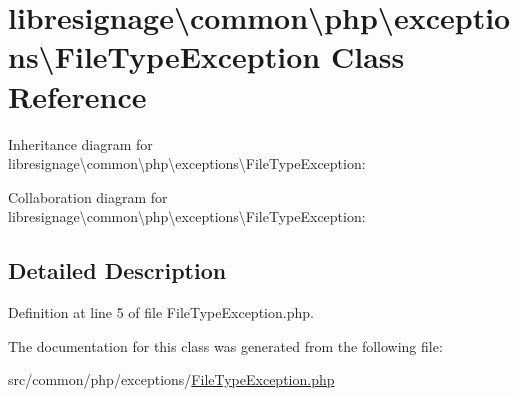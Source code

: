 \hypertarget{classlibresignage_1_1common_1_1php_1_1exceptions_1_1FileTypeException}{}\section{libresignage\textbackslash{}common\textbackslash{}php\textbackslash{}exceptions\textbackslash{}File\+Type\+Exception Class Reference}
\label{classlibresignage_1_1common_1_1php_1_1exceptions_1_1FileTypeException}


Inheritance diagram for libresignage\textbackslash{}common\textbackslash{}php\textbackslash{}exceptions\textbackslash{}File\+Type\+Exception\+:


Collaboration diagram for libresignage\textbackslash{}common\textbackslash{}php\textbackslash{}exceptions\textbackslash{}File\+Type\+Exception\+:


\subsection{Detailed Description}


Definition at line 5 of file File\+Type\+Exception.\+php.



The documentation for this class was generated from the following file\+:\begin{DoxyCompactItemize}
\item 
src/common/php/exceptions/\hyperlink{FileTypeException_8php}{File\+Type\+Exception.\+php}\end{DoxyCompactItemize}
